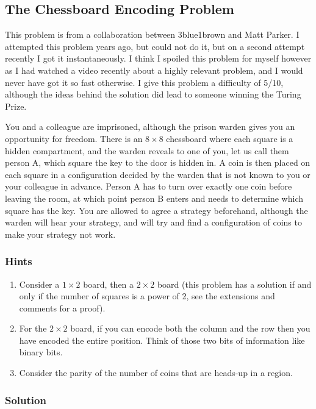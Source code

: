 \subsection{The Chessboard Encoding Problem}

This problem is from a collaboration between 3blue1brown and Matt Parker. I attempted this problem years ago, but could not do it, but on a second attempt recently I got it instantaneously. I think I spoiled this problem for myself however as I had watched a video recently about a highly relevant problem, and I would never have got it so fast otherwise. I give this problem a difficulty of 5/10, although the ideas behind the solution did lead to someone winning the Turing Prize.

You and a colleague are imprisoned, although the prison warden gives you an opportunity for freedom. There is an $8 \times 8$ chessboard where each square is a hidden compartment, and the warden reveals to one of you, let us call them person A, which square the key to the door is hidden in. A coin is then placed on each square in a configuration decided by the warden that is not known to you or your colleague in advance. Person A has to turn over exactly one coin before leaving the room, at which point person B enters and needs to determine which square has the key. You are allowed to agree a strategy beforehand, although the warden will hear your strategy, and will try and find a configuration of coins to make your strategy not work.

\subsubsection{Hints}

\begin{enumerate}
	\item Consider a $1 \times 2$ board, then a $2 \times 2$ board (this problem has a solution if and only if the number of squares is a power of 2, see the extensions and comments for a proof).
	\item For the $2 \times 2$ board, if you can encode both the column and the row then you have encoded the entire position. Think of those two bits of information like binary bits.
	\item Consider the parity of the number of coins that are heads-up in a region.
\end{enumerate}

\subsubsection{Solution}

